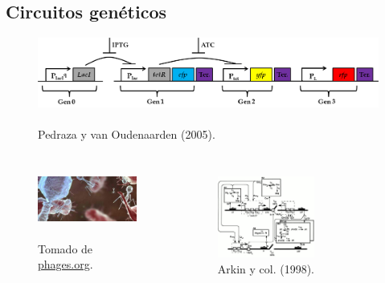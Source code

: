 \documentclass[xcolor=dvipsnames]{beamer}
\begin{document}
\subsection{Circuitos gen\'eticos}
\begin{frame}
\begin{figure}[p]
    \centering
    \includegraphics[width=1\textwidth]{Pcon-circuit_simple}~\\
    \tiny Pedraza y van Oudenaarden (2005).
\end{figure}

\begin{columns}[c]


\begin{figure}[p]
    \centering
    \includegraphics[width=\textwidth]{phageim}~\\
    \tiny Tomado de \url{phages.org}.
\end{figure}

\vspace{-5mm}
\begin{figure}[p]
    \centering
    \includegraphics[width=0.6\textwidth]{con-biocircuits_comp.png}~\\
    \tiny Arkin y col. (1998).
\end{figure}
\end{columns}
\end{frame}
\end{document}
